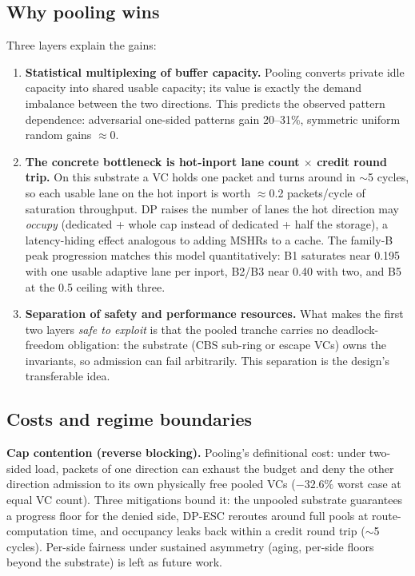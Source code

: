 \documentclass[10pt]{article}
\begin{document}
\subsection{Why pooling wins}

Three layers explain the gains:

\begin{enumerate}
  \item \textbf{Statistical multiplexing of buffer capacity.} Pooling
    converts private idle capacity into shared usable capacity; its value
    is exactly the demand imbalance between the two directions. This
    predicts the observed pattern dependence: adversarial one-sided
    patterns gain 20--31\%, symmetric uniform random gains $\approx$0.
  \item \textbf{The concrete bottleneck is hot-inport lane count
    $\times$ credit round trip.} On this substrate a VC holds one packet
    and turns around in $\sim$5 cycles, so each usable lane on the hot
    inport is worth $\approx$0.2 packets/cycle of saturation throughput.
    DP raises the number of lanes the hot direction may \emph{occupy}
    (dedicated + whole cap instead of dedicated + half the storage), a
    latency-hiding effect analogous to adding MSHRs to a cache. The
    family-B peak progression matches this model quantitatively: B1
    saturates near 0.195 with one usable adaptive lane per inport,
    B2/B3 near 0.40 with two, and B5 at the 0.5 ceiling with three.
  \item \textbf{Separation of safety and performance resources.} What
    makes the first two layers \emph{safe to exploit} is that the pooled
    tranche carries no deadlock-freedom obligation: the substrate (CBS
    sub-ring or escape VCs) owns the invariants, so admission can fail
    arbitrarily. This separation is the design's transferable idea.
\end{enumerate}

\subsection{Costs and regime boundaries}

\textbf{Cap contention (reverse blocking).} Pooling's definitional cost:
under two-sided load, packets of one direction can exhaust the budget and
deny the other direction admission to its own physically free pooled VCs
($-32.6\%$ worst case at equal VC count). Three mitigations bound it: the
unpooled substrate guarantees a progress floor for the denied side,
DP-ESC reroutes around full pools at route-computation time, and
occupancy leaks back within a credit round trip ($\sim$5 cycles).
Per-side fairness under sustained asymmetry (aging, per-side floors
beyond the substrate) is left as future work.
\end{document}
